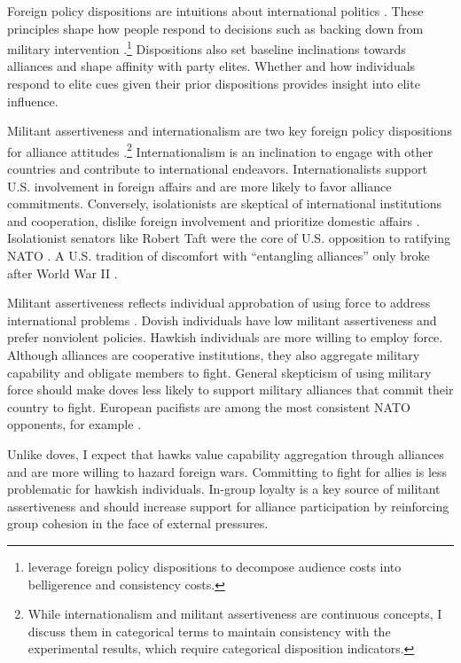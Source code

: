 \documentclass[12pt]{article}
\begin{document}
Foreign policy dispositions are intuitions about international politics \citep{KertzerTingley2018}. 
These principles shape how people respond to decisions such as backing down from military intervention \citep{KertzerBrutger2016}.\footnote{\citet{KertzerBrutger2016} leverage foreign policy dispositions to decompose audience costs into belligerence and consistency costs.}
Dispositions also set baseline inclinations towards alliances and shape affinity with party elites.
Whether and how individuals respond to elite cues given their prior dispositions provides insight into elite influence. 


Militant assertiveness and internationalism are two key foreign policy dispositions for alliance attitudes \citep{Herrmannetal1999}.\footnote{While internationalism and militant assertiveness are continuous concepts, I discuss them in categorical terms to maintain consistency with the experimental results, which require categorical disposition indicators.}
Internationalism is an inclination to engage with other countries and contribute to international endeavors. 
Internationalists support U.S. involvement in foreign affairs and are more likely to favor alliance commitments. 
Conversely, isolationists are skeptical of international institutions and cooperation, dislike foreign involvement and prioritize domestic affairs \citep{Kertzer2013}. 
Isolationist senators like Robert Taft were the core of U.S. opposition to ratifying NATO \citep{Kaplan2007}.
A U.S. tradition of discomfort with ``entangling alliances'' only broke after World War II \citep{Kupchan2020}.


Militant assertiveness reflects individual approbation of using force to address international problems \citep{Herrmannetal1999}. 
Dovish individuals have low militant assertiveness and prefer nonviolent policies.
Hawkish individuals are more willing to employ force.
Although alliances are cooperative institutions, they also aggregate military capability and obligate members to fight.
General skepticism of using military force should make doves less likely to support military alliances that commit their country to fight.  
European pacifists are among the most consistent NATO opponents, for example \citep{Thies2015}.


Unlike doves, I expect that hawks value capability aggregation through alliances and are more willing to hazard foreign wars. 
Committing to fight for allies is less problematic for hawkish individuals. 
In-group loyalty is a key source of militant assertiveness \citep{Kertzeretal2014} and should increase support for alliance participation by reinforcing group cohesion in the face of external pressures.
\end{document}
